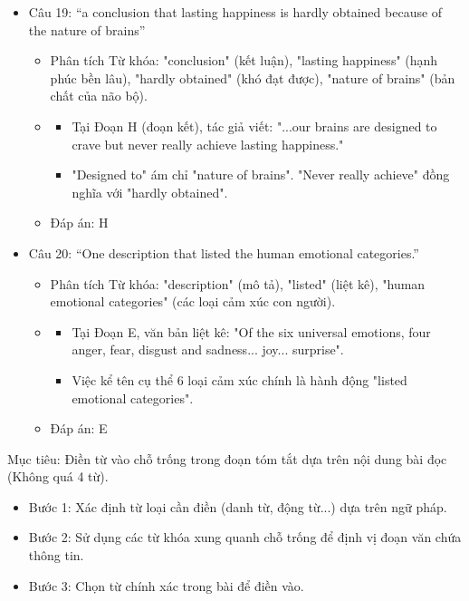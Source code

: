 \documentclass{../templateReading/cdreading}
\begin{document}
\begin{itemize}
\begin{itemize}
\end{itemize}
\item Câu 19: “a conclusion that lasting happiness is hardly obtained because of the nature of brains”
\begin{itemize}
\item Phân tích Từ khóa: "conclusion" (kết luận), "lasting happiness" (hạnh phúc bền lâu), "hardly obtained" (khó đạt được), "nature of brains" (bản chất của não bộ).
\item {}
\begin{itemize}
\item Tại Đoạn H (đoạn kết), tác giả viết: "...our brains are designed to crave but never really achieve lasting happiness."
\item "Designed to" ám chỉ "nature of brains". "Never really achieve" đồng nghĩa với "hardly obtained".
\end{itemize}
\item Đáp án: H
\end{itemize}
\item Câu 20: “One description that listed the human emotional categories.”
\begin{itemize}
\item Phân tích Từ khóa: "description" (mô tả), "listed" (liệt kê), "human emotional categories" (các loại cảm xúc con người).
\item {}
\begin{itemize}
\item Tại Đoạn E, văn bản liệt kê: "Of the six universal emotions, four anger, fear, disgust and sadness... joy... surprise".
\item Việc kể tên cụ thể 6 loại cảm xúc chính là hành động "listed emotional categories".
\end{itemize}
\item Đáp án: E
\end{itemize}
\end{itemize}


Mục tiêu: Điền từ vào chỗ trống trong đoạn tóm tắt dựa trên nội dung bài đọc (Không quá 4 từ).

\begin{itemize}
\item Bước 1: Xác định từ loại cần điền (danh từ, động từ...) dựa trên ngữ pháp.
\item Bước 2: Sử dụng các từ khóa xung quanh chỗ trống để định vị đoạn văn chứa thông tin.
\item Bước 3: Chọn từ chính xác trong bài để điền vào.
\end{itemize}
\end{document}
